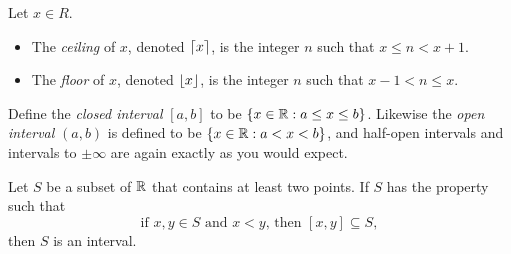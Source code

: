 \documentclass[11pt,twoside=off,numbers=noenddot]{scrbook}
\begin{document}
\begin{definition}
  Let $x \in R$.
  \begin{itemize}
    \item The \textit{ceiling} of $x$, denoted $\lceil x \rceil$, is the
      integer $n$ such that $x \leq n < x + 1$.
    \item The \textit{floor} of $x$, denoted $\lfloor x \rfloor$, is the
      integer $n$ such that $x  - 1 < n \leq x$.
  \end{itemize}
\end{definition}

\begin{definition}
  Define the \textit{closed interval} $[a, b]$ to be $\{ x \in \mathbb R
  : a \leq x \leq b \}$. Likewise the \textit{open interval} $(a, b)$
  is defined to be $\{ x \in \mathbb R : a < x < b \}$, and half-open
  intervals and intervals to $\pm\infty$ are again exactly as you would expect.
\end{definition}

\begin{theorem}
  Let $S$ be a subset of $\mathbb R$ that contains at least two points. If
  $S$ has the property such that
  \[ \text{if $x, y \in S$ and $x < y$, then $[x, y] \subseteq S$}, \tag{1} \]
  then $S$ is an interval.
\end{theorem}
\end{document}
